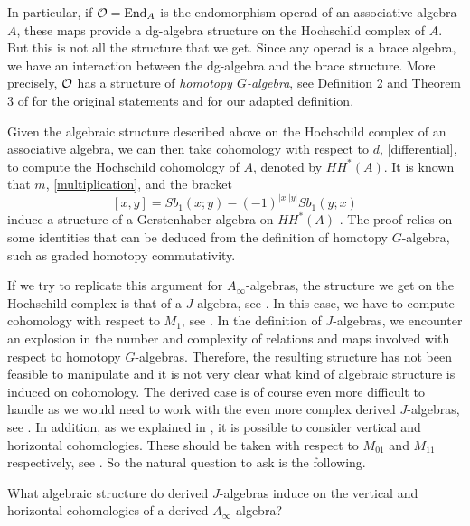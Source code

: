 \documentclass[Thesis.tex]{subfiles}
\begin{document}
In particular, if ${\mathcal O} = \operatorname{End}_{A}$ is the endomorphism operad of an associative algebra $A$, these maps provide a dg-algebra structure on the Hochschild complex of $A$. %
But this is not all the structure that we get. Since any operad is a brace algebra, we have an interaction between the dg-algebra and the brace structure. More precisely, ${\mathcal O}$ has a structure of \emph{homotopy $G$-algebra}, see Definition 2 and Theorem 3 of \cite{GV} for the original statements and  for our adapted definition.%

 
 Given the algebraic structure described above on the Hochschild complex of an associative algebra, we can then take cohomology with respect to $d$, \cref{differential}, to compute the Hochschild cohomology of $A$, denoted by $HH^*(A)$. It is known that $m$, \cref{multiplication}, and the bracket 
\[[x,y]=Sb_1(x; y) -(-1)^{|x||y|}Sb_1(y; x)\]
induce a structure of a Gerstenhaber algebra on $HH^*(A)$ \cite[Corollary 5]{GV}. The proof relies on some identities that can be deduced from the definition of homotopy $G$-algebra, such as graded homotopy commutativity. 

If we try to replicate this argument for $A_\infty$-algebras, the structure we get on the Hochschild complex is that of a $J$-algebra, see . In this case, we have to compute cohomology with respect to $M_1$, see . In the definition of $J$-algebras, we encounter an explosion in the number and complexity of relations and maps involved with respect to homotopy $G$-algebras. Therefore, the resulting structure has not been feasible to manipulate and it is not very clear what kind of algebraic structure is induced on cohomology. The derived case is of course even more difficult to handle as we would need to work with the even more complex derived $J$-algebras, see . In addition, as we explained in , it is possible to consider vertical and horizontal cohomologies. These should be taken with respect to $M_{01}$ and $M_{11}$ respectively, see . So the natural question to ask is the following. %


\begin{question}{3}
What algebraic structure do derived $J$-algebras induce on the vertical and horizontal cohomologies of a derived $A_\infty$-algebra?
\end{question}


\end{document}

